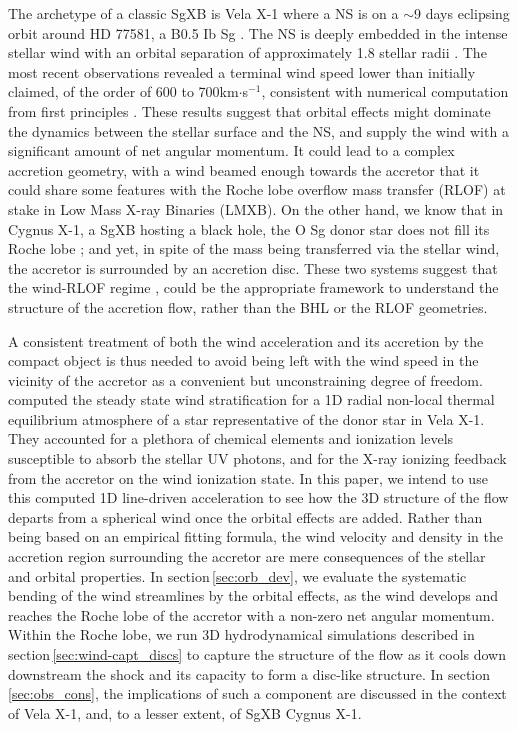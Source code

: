 \documentclass{aa}
\makeatletter
\newcommand{\sgx}{SgXB\xspace}
\newcommand*{\lmxb}{LMXB\@\xspace}
\newcommand*{\rlof}{RLOF\@\xspace}
\newcommand*{\ns}{NS\@\xspace}
\newcommand{\mystar}{{\fontfamily{lmr}\selectfont$\star$}}
\makeatother
\begin{document}
The archetype of a classic \sgx is Vela X-1 where a \ns is on a $\sim$9 days eclipsing orbit around HD 77581, a B0.5 Ib Sg \citep{Hiltner1972,Forman1973}. The \ns is deeply embedded in the intense stellar wind \citep[with a mass loss rate $\dot{M}_{\text{\mystar}}\sim$1.3$\cdot$10$^{-6}$M$_{\odot}$yr$^{-1}$][]{Gimenez-Garcia2016} with an orbital separation of approximately 1.8 stellar radii \citep{Quaintrell2003a}. The most recent observations revealed a terminal wind speed lower than initially claimed, of the order of 600 to 700km$\cdot$s$^{-1}$, consistent with numerical computation from first principles \citep{Sander2017}. These results suggest that orbital effects might dominate the dynamics between the stellar surface and the \ns, and supply the wind with a significant amount of net angular momentum. It could lead to a complex accretion geometry, with a wind beamed enough towards the accretor that it could share some features with the Roche lobe overflow mass transfer (\rlof) at stake in Low Mass X-ray Binaries (\lmxb). On the other hand, we know that in Cygnus X-1, a \sgx hosting a black hole, the O Sg donor star does not fill its Roche lobe \citep{Orosz2011} ; and yet, in spite of the mass being transferred via the stellar wind, the accretor is surrounded by an accretion disc. These two systems suggest that the wind-\rlof regime \citep[first studied in the context of symbiotic binaries by][]{Mohamed2007}, could be the appropriate framework to understand the structure of the accretion flow, rather than the BHL or the \rlof geometries.

A consistent treatment of both the wind acceleration and its accretion by the compact object is thus needed to avoid being left with the wind speed in the vicinity of the accretor as a convenient but unconstraining degree of freedom. \cite{Sander2017} computed the steady state wind stratification for a 1D radial non-local thermal equilibrium atmosphere of a star representative of the donor star in Vela X-1. They accounted for a plethora of chemical elements and ionization levels susceptible to absorb the stellar UV photons, and for the X-ray ionizing feedback from the accretor on the wind ionization state. In this paper, we intend to use this computed 1D line-driven acceleration to see how the 3D structure of the flow departs from a spherical wind once the orbital effects are added. Rather than being based on an empirical fitting formula, the wind velocity and density in the accretion region surrounding the accretor are mere consequences of the stellar and orbital properties. In section\,\ref{sec:orb_dev}, we evaluate the systematic bending of the wind streamlines by the orbital effects, as the wind develops and reaches the Roche lobe of the accretor with a non-zero net angular momentum. Within the Roche lobe, we run 3D hydrodynamical simulations described in section\,\ref{sec:wind-capt_discs} to capture the structure of the flow as it cools down downstream the shock and its capacity to form a disc-like structure. In section\,\ref{sec:obs_cons}, the implications of such a component are discussed in the context of Vela X-1, and, to a lesser extent, of \sgx Cygnus X-1. 
\end{document}
